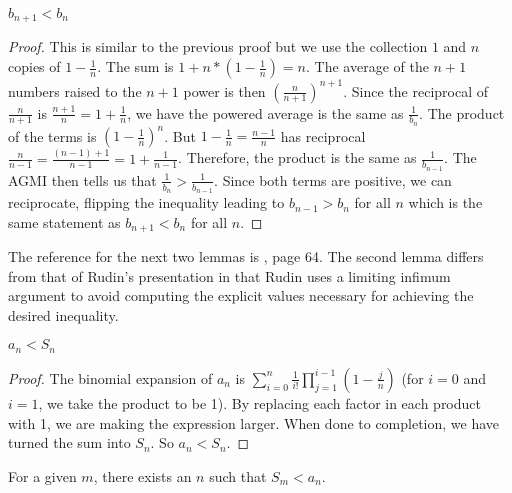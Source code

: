 \documentclass[12pt]{article}
\begin{document}
\begin{lemma}
 $b_{n+1} < b_n$
\end{lemma}

\begin{proof}
This is similar to the previous proof but we use the collection $1$ and $n$ copies of $1 - \frac{1}{n}$. The sum is $1 + n*(1-\frac{1}{n}) = n$. The average of the $n+1$ numbers raised to the $n+1$ power is then $(\frac{n}{n+1})^{n+1}$. Since the reciprocal of $\frac{n}{n+1}$ is $\frac{n+1}{n} = 1+\frac{1}{n}$, we have the powered average is the same as $\frac{1}{b_n}$. The product of the terms is $(1-\frac{1}{n})^n$. But $1 - \frac{1}{n} = \frac{n-1}{n}$ has reciprocal $\frac{n}{n-1} = \frac{ (n-1) + 1}{n-1} = 1 + \frac{1}{n-1}$. Therefore, the product is the same as $\frac{1}{b_{n-1}}$. The AGMI then tells us that $\frac{1}{b_n} > \frac{1}{b_{n-1}}$. Since both terms are positive, we can reciprocate, flipping the inequality leading to $b_{n-1} > b_n$ for all $n$ which is the same statement as $b_{n+1} < b_n$ for all $n$. 
\end{proof}

The reference for the next two lemmas is \cite{rudin}, page 64. The second lemma differs from that of Rudin's presentation in that Rudin uses a limiting infimum argument to avoid computing the explicit values necessary for achieving the desired inequality. 

\begin{lemma}\label{lem:ansn}
$a_n < S_n$
\end{lemma}

\begin{proof}
The binomial expansion of $a_n$ is $\sum_{i=0}^n \frac{1}{i!} \prod_{j=1}^{i-1} (1-\tfrac{j}{n})$ (for $i=0$ and $i=1$, we take the product to be 1). By replacing each factor in each product with 1, we are making the expression larger. When done to completion, we have turned the sum into $S_n$. So $a_n < S_n$.
\end{proof}

\begin{lemma}\label{lem:snam}
For a given $m$, there exists an $n$ such that $S_m < a_n$.   
\end{lemma}
\end{document}
